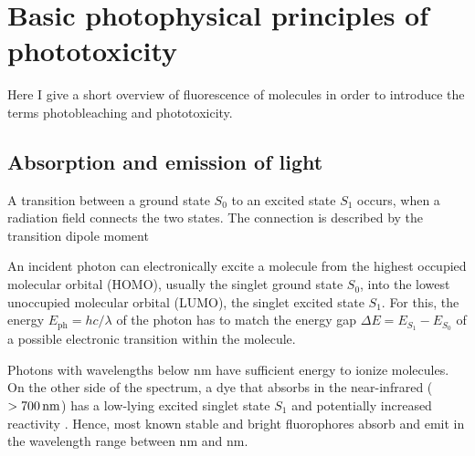 
\section{Basic photophysical principles of phototoxicity}
\begin{summary}
  Here I give a short overview of fluorescence of molecules in order
  to introduce the terms photobleaching and phototoxicity.
\end{summary}

\newcommand{\vmu}{\mbox{\boldmath{$\mu$}}}
\subsection{Absorption and emission of light}
A transition between a ground state $S_0$ to an excited state $S_1$     
occurs, when a radiation field connects the two states. The connection
is described by the transition dipole moment

An incident photon can electronically excite a molecule from the
highest occupied molecular orbital (HOMO), usually the singlet ground
state $S_0$, into the lowest unoccupied molecular orbital (LUMO), the
singlet excited state $S_1$. For this, the energy $E_\textrm{ph}=hc/\lambda$ of the
photon has to match the energy gap $\Delta E=E_{S_1}-E_{S_0}$ of a
possible electronic transition within the molecule.

Photons with wavelengths below \unit[200]{nm} have sufficient energy     
to ionize molecules. On the other side of the spectrum, a dye that
absorbs in the near-infrared ($\unit[>700]{nm}$) has a low-lying
excited singlet state $S_1$ and potentially increased reactivity
\citep{Sauer2011}. Hence, most known stable and bright fluorophores
absorb and emit in the wavelength range between \unit[300]{nm} and
\unit[700]{nm}.


